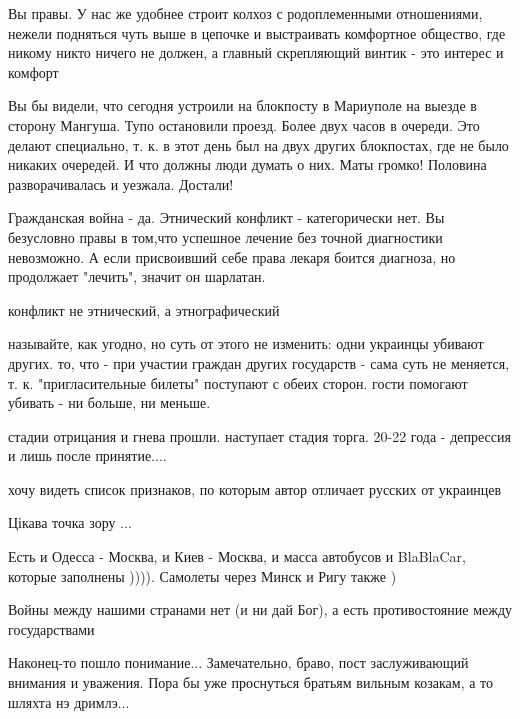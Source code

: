\begin{itemize}
\begin{itemize} %

Вы правы. У нас же удобнее строит колхоз с родоплеменными отношениями, нежели
подняться чуть выше в цепочке и выстраивать комфортное общество, где никому
никто ничего не должен, а главный скрепляющий винтик - это интерес и комфорт

\end{itemize} %


Вы бы видели, что сегодня устроили на блокпосту в Мариуполе на выезде в сторону
Мангуша. Тупо остановили проезд. Более двух часов в очереди. Это делают
специально, т. к. в этот день был на двух других блокпостах, где не было никаких
очередей. И что должны люди думать о них. Маты громко! Половина разворачивалась и
уезжала. Достали!



Гражданская война - да. Этнический конфликт - категорически нет. Вы безусловно
правы в том,что успешное лечение без точной диагностики невозможно. А если
присвоивший себе права лекаря боится диагноза, но продолжает "лечить", значит он
шарлатан.

\begin{itemize} %
конфликт не этнический, а этнографический
\end{itemize} %


называйте, как угодно, но суть от этого не изменить: одни украинцы убивают
других. то, что - при участии граждан других государств - сама суть не
меняется, т. к. "пригласительные билеты" поступают с обеих сторон. гости помогают
убивать - ни больше, ни меньше.

стадии отрицания и гнева прошли. наступает стадия торга. 20-22 года - депрессия и лишь после принятие....

хочу видеть список признаков, по которым автор отличает русских от украинцев

Цікава точка зору ...

Есть и Одесса - Москва, и Киев - Москва, и масса автобусов и BlaBlaCar, которые заполнены )))). Самолеты через Минск и Ригу также )

Войны между нашими странами нет (и ни дай Бог), а есть противостояние между государствами


Наконец-то пошло понимание... Замечательно, браво, пост заслуживающий внимания
и уважения. Пора бы уже проснуться братьям вильным козакам, а то шляхта нэ
дримлэ...

\end{itemize} %
